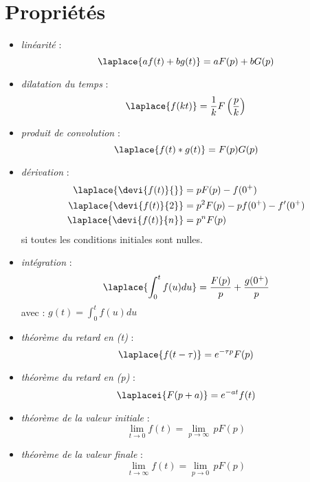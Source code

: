 \section{Propriétés} 
\begin{itemize}
\item \emph{linéarité} :
$$ 
\laplace{af(t)+bg(t)} = aF(p) + bG(p)
$$ 
\item \emph{dilatation du temps} : 
$$
\laplace{f(kt)}=\dfrac{1}{k}F\left(\dfrac{p}{k}\right)
$$
\item \emph{produit de convolution} : 
$$
\laplace{f(t)*g(t)} = F(p)G(p)
$$
\item \emph{dérivation} : 
\begin{align*}
\laplace{\devi{f(t)}{}}&=pF(p) - f(0^+) \\
\laplace{\devi{f(t)}{2}}&=p^2F(p) - pf(0^+) - f'(0^+)\\
\laplace{\devi{f(t)}{n}}&=p^nF(p) 
\end{align*}
si toutes les conditions initiales sont nulles.
\item \emph{intégration} :
$$
\laplace{\int_0^t f(u)du} = \dfrac{F(p)}{p} + \dfrac{g(0^+)}{p}
$$
avec :
$g(t)=\int_0^t f(u)du$
\item \emph{théorème du retard en (t)} :
$$
\laplace{f(t-\tau)}=e^{-\tau p}F(p)
$$
\item \emph{théorème du retard en (p)} :
$$
\laplacei{F(p+a)}=e^{-at}f(t)
$$
\item \emph{théorème de la valeur initiale} :
$$
\lim\limits_{t \to 0} f(t)=\lim\limits_{p \to \infty}\, p F(p)
$$
\item \emph{théorème de la valeur finale} :
$$
\lim\limits_{t \to \infty} f(t)=\lim\limits_{p \to 0}\,p F(p)
$$
\end{itemize}
\clearpage
